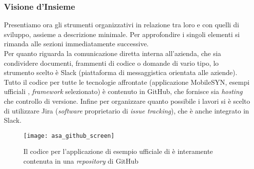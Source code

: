 \subsubsection{Visione d'Insieme}
Presentiamo ora gli strumenti organizzativi in relazione tra loro e con quelli di sviluppo, assieme a descrizione minimale. Per approfondire i singoli elementi si rimanda alle sezioni immediatamente successive.\\
Per quanto riguarda la comunicazione diretta interna all'azienda, che sia condividere documenti, frammenti di codice o domande di vario tipo, lo strumento scelto è Slack (piattaforma di messaggistica orientata alle aziende).\\
Tutto il codice per tutte le tecnologie affrontate (applicazione MobileSYN, esempi ufficiali \asa{}, \textit{framework} selezionato) è contenuto in GitHub, che fornisce sia \textit{hosting} che controllo di versione. Infine per organizzare quanto possibile i lavori si è scelto di utilizzare Jira (\textit{software} proprietario di \textit{issue tracking}), che è anche integrato in Slack.\\
\begin{figure}[H]
    \centering
    \texttt{[image: asa\_github\_screen]}
    \caption[\textit{Repository} per esempio \asa{}]{Il codice per l'applicazione di esempio ufficiale di \asa{} è interamente contenuta in una \textit{repository} di GitHub\footnotemark}
\end{figure}

